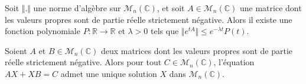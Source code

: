 
  \begin{lemma}
    Soit $\Vert . \Vert$ une norme d'algèbre sur $\mathcal{M}_n(\mathbb{C})$, et soit $A \in \mathcal{M}_n(\mathbb{C})$ une matrice dont les valeurs propres sont de partie réelle strictement négative. Alors il existe une fonction polynomiale $P : \mathbb{R} \rightarrow \mathbb{R}$ et $\lambda > 0$ tels que $\Vert e^{tA} \Vert \leq e^{- \lambda t} P(t)$.
  \end{lemma}


  \begin{application}
    Soient $A$ et $B \in \mathcal{M}_n(\mathbb{C})$ deux matrices dont les valeurs propres sont de partie réelle strictement négative. Alors pour tout $C \in \mathcal{M}_n(\mathbb{C})$, l'équation $AX + XB = C$ admet une unique solution $X$ dans $\mathcal{M}_n(\mathbb{C})$.
  \end{application}

